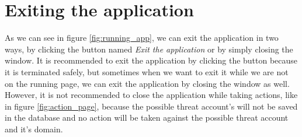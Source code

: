 \section{Exiting the application}
As we can see in figure \ref{fig:running_app}, we can exit the application in two ways, by clicking the button named \textit{Exit the application} or by simply closing the window. It is recommended to exit the application by clicking the button because it is terminated safely, but sometimes when we want to exit it while we are not on the running page, we can exit the application by closing the window as well. However, it is not recommended to close the application while taking actions, like in figure \ref{fig:action_page}, because the possible threat account's will not be saved in the database and no action will be taken against the possible threat account and it's domain.




